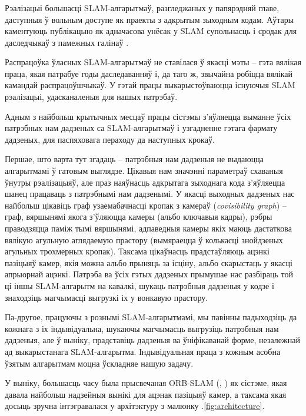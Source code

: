 \subsubsection*{\nextTitle}

Рэалізацыі большасці SLAM-алгарытмаў, разгледжаных у папярэдняй главе, даступныя ў вольным доступе
як праекты з адкрытым зыходным кодам. Аўтары каментуюць публікацыю як адначасова
унёсак у SLAM супольнасць і сродак для даследчыкаў з памежных галінаў \cite{murORB2}.

Распрацоўка ўласных SLAM-алгарытмаў не ставілася ў якасці мэты -- гэта вялікая праца,
якая патрабуе годы даследаванняў і, да таго ж, звычайна робіцца вялікай камандай распрацоўшчыкаў.
У гэтай працы выкарыстоўваюцца існуючыя SLAM рэалізацыі, удасканаленыя для нашых патрэбаў.

Адным з найбольш крытычных месцаў працы сістэмы з'яўляецца выманне ўсіх патрэбных нам дадзеных
са SLAM-алгарытмаў і узгадненне гэтага фармату дадзеных, для паспяховага пераходу да
наступных крокаў.

Першае, што варта тут згадаць -- патрэбныя нам дадзеныя не выдаюцца алгарытмамі ў гатовым выглядзе.
Цікавыя нам значэнні параметраў схаваныя ўнутры рэалізацыяў, але праз наяўнасць адкрытага зыходнага
кода з'яўляецца шанец працаваць з патрэбнымі нам дадзенымі.
У якасці выходных дадзеных нас найбольш цікавіць граф узаемабачнасці кропак з камераў
(\textit{covisibility graph}) -- граф, вяршынямі якога з'ўляюцца камеры (альбо ключавыя кадры), рэбры
праводзяцца паміж тымі вяршынямі, адпаведныя камеры якіх маюць дастаткова вялікую агульную
аглядаемую прастору (вымяраецца ў колькасці знойдзеных агульных трохмерных кропак). Таксама
цікаўнасць прадстаўляюць ацэнкі пазіцыяў камер, якія можна альбо прыняць за ісціну, альбо
скарыстаць у якасці апрыорнай ацэнкі. Патрэба ва ўсіх гэтых дадзеных прымушае нас
разбіраць той ці іншы SLAM-алгарытм на кавалкі, шукаць патрэбныя дадзеныя у кодзе і знаходзіць магчымасці
выгрузкі іх у вонкавую прастору.

Па-другое, працуючы з рознымі SLAM-алгарытмамі, мы павінны падыходзіць да кожнага з іх
індывідуальна, шукаючы магчымасць выгрузіць патрэбныя нам дадзеныя, але ў выніку,
прадставіць дадзеныя ва ўніфікаванай форме, незалежнай ад выкарыстанага SLAM-алгарытма.
Індывідуальная праца з кожным асобна ўзятым алгарытмам моцна ўскладняе нашую задачу.

У выніку, большасць часу была прысвечаная ORB-SLAM (\cite{murTRO2015}, \cite{murORB2}) як сістэме,
якая давала найбольш надзейныя вынікі для ацэнак пазіцыяў камер, а таксама якая
досыць зручна інтэгравалася у архітэктуру з малюнку \cursection.\ref{fig:architecture}.

